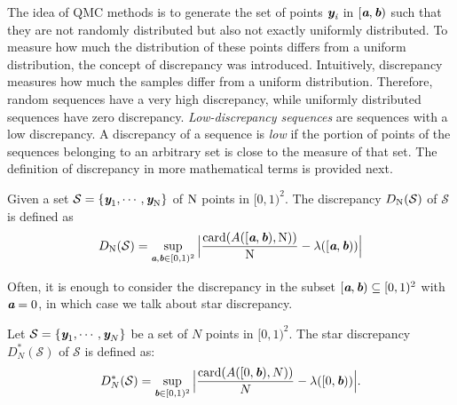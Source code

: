 The idea of QMC methods is to generate the set of points $\textit{\textbf{y}}_{\textit{i}}$ in $[\textit{\textbf{a}},\textit{\textbf{b}})$ such that they are not randomly distributed but also not exactly uniformly distributed. 
To measure how much the distribution of these points differs from a uniform distribution, the concept of discrepancy was introduced. 
Intuitively, discrepancy measures how much the samples differ from a uniform distribution. 
Therefore, random sequences have a very high discrepancy, while uniformly distributed sequences have zero discrepancy. 
\textit{Low-discrepancy sequences} are sequences with a low discrepancy\cite{owen2003quasi}. A discrepancy of a sequence is \textit{low} if the portion of points of the sequences belonging to an arbitrary set is close to the measure of that set.
The definition of discrepancy in more mathematical terms is provided next. 
\begin{definition}
Given a set $\mathcal{S} = \{\textit{\textbf{y}}_1, \cdots, \textit{\textbf{y}}_{\textrm{N}}\}$ of $\textrm{N}$ points in $[0,1)^2$. The discrepancy $D_{\textrm{N}}({\mathcal{S}})$ of $\mathcal{S}$ is defined as
\begin{equation}
D_{\textrm{N}}({\mathcal{S}}) = \sup_{\textit{\textbf{a}}, \textit{\textbf{b}}\in[0,1)^2}\Big|\frac{\textrm{card}(A([\textit{\textbf{a}},\textit{\textbf{b}}), \textrm{N}))}{\textrm{N}}-\lambda([\textit{\textbf{a}}, \textit{\textbf{b}}))\Big|
\end{equation}
\end{definition}
Often, it is enough to consider the discrepancy in the subset $[\textit{\textbf{a}},\textit{\textbf{b}})\subseteq[0,1)^2$ with $\textit{\textbf{a}}=0$, in which case we talk about star discrepancy.
 \begin{definition}
Let $\mathcal{S} = \{\textit{\textbf{y}}_1, \cdots, \textit{\textbf{y}}_N\}$ be a set of $N$ points in $[0,1)^2$. The  star discrepancy $D^*_N({\mathcal{S}})$ of $\mathcal{S}$ is defined as:
\begin{equation}
D^*_N({\mathcal{S}}) = \sup_{\textit{\textbf{b}}\in[0,1)^2}\Big|\frac{\textrm{card}(A([0,\textit{\textbf{b}}), N))}{N}-\lambda([0, \textit{\textbf{b}}))\Big|.
\end{equation}
\end{definition}
